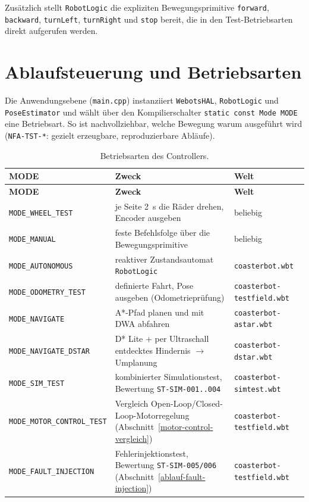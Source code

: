 \documentclass[
  a4paper,
  12pt,
  DIV=12,        %
  parskip=half,  %
  headings=small %
]{scrartcl}
\theoremstyle{definition}
\theoremstyle{definition}
\begin{document}
Zusätzlich stellt \texttt{RobotLogic} die expliziten Bewegungsprimitive
\texttt{forward}, \texttt{backward}, \texttt{turnLeft}, \texttt{turnRight}
und \texttt{stop} bereit, die in den Test-Betriebsarten direkt aufgerufen
werden.

\section{Ablaufsteuerung und Betriebsarten}\label{ablaufsteuerung}

Die Anwendungsebene (\texttt{main.cpp}) instanziiert \texttt{WebotsHAL},
\texttt{RobotLogic} und \texttt{PoseEstimator} und wählt über den
Kompilierschalter \texttt{static const Mode MODE} eine Betriebsart. So
ist nachvollziehbar, welche Bewegung warum ausgeführt wird
(\texttt{NFA-TST-*}: gezielt erzeugbare, reproduzierbare Abläufe).

\begin{longtable}[]{@{}
  >{\raggedright\arraybackslash}p{}
  >{\raggedright\arraybackslash}p{}
  >{\raggedright\arraybackslash}p{}@{}}
\caption{Betriebsarten des Controllers.}\label{tab:modes}\\
\toprule
\textbf{MODE} & \textbf{Zweck} & \textbf{Welt}\\
\midrule
\endfirsthead
\toprule
\textbf{MODE} & \textbf{Zweck} & \textbf{Welt}\\
\midrule
\endhead
\bottomrule
\endfoot
\texttt{MODE\_WHEEL\_TEST} & je Seite \SI{2}{\second} die Räder drehen, Encoder ausgeben & \small beliebig\\
\texttt{MODE\_MANUAL} & feste Befehlsfolge über die Bewegungsprimitive & \small beliebig\\
\texttt{MODE\_AUTONOMOUS} & reaktiver Zustandsautomat \texttt{RobotLogic} & \small\texttt{coasterbot.wbt}\\
\texttt{MODE\_ODOMETRY\_TEST} & definierte Fahrt, Pose ausgeben (Odometrieprüfung) & \small\texttt{coasterbot-testfield.wbt}\\
\texttt{MODE\_NAVIGATE} & A*-Pfad planen und mit DWA abfahren & \small\texttt{coasterbot-astar.wbt}\\
\texttt{MODE\_NAVIGATE\_DSTAR} & D* Lite + per Ultraschall entdecktes Hindernis $\to$ Umplanung & \small\texttt{coasterbot-dstar.wbt}\\
\texttt{MODE\_SIM\_TEST} & kombinierter Simulationstest, Bewertung \texttt{ST-SIM-001..004} & \small\texttt{coasterbot-simtest.wbt}\\
\texttt{MODE\_MOTOR\_CONTROL\_TEST} & Vergleich Open-Loop/Closed-Loop-Motorregelung (Abschnitt~\ref{motor-control-vergleich}) & \small\texttt{coasterbot-testfield.wbt}\\
\texttt{MODE\_FAULT\_INJECTION} & Fehlerinjektionstest, Bewertung \texttt{ST-SIM-005/006} (Abschnitt~\ref{ablauf-fault-injection}) & \small\texttt{coasterbot-testfield.wbt}\\
\bottomrule
\end{longtable}
\end{document}
